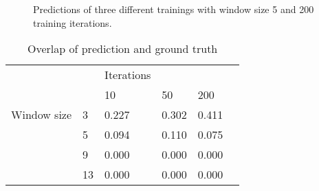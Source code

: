 \documentclass{article}
\begin{document}
{\begin{figure}
    \caption{Predictions of three different trainings with window size 5 and 200 training iterations.}
    
\end{figure}

\begin{table}[b]
  \caption{Overlap of prediction and ground truth}
  \label{overlap}
  \centering
  \begin{tabular}{llllll}
			    & &Iterations &&\\
                &    & 10    & 50    & 200 \\
    Window size & 3  & 0.227 & 0.302 & 0.411 \\
                & 5  & 0.094 & 0.110 & 0.075 \\
                & 9  & 0.000 & 0.000 & 0.000 \\
                & 13 & 0.000 & 0.000 & 0.000 \\
  \end{tabular}
\end{table}

}
\end{document}
